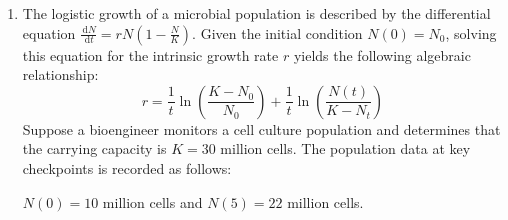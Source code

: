 \documentclass[11pt,svgnames,spanish,oneside]{amsart}
\newenvironment{mysolution}{%
  \bigskip

  \solution\color{blue}Sol:
}{%
  \endsolution
}
\newcommand{\dd}{\, \text{d}}
\begin{document}
\begin{enumerate}[label=\textbf{P\arabic*.},itemsep=1em,leftmargin=*]
\begin{enumerate}
\begin{enumerate}
      \begin{center}
      \emph{The expected value of $X$ is $\mu$.}
      \end{center}
    \end{enumerate}
    \begin{mysolution}
      \begin{enumerate}[label=(\alph*)]
        \item The value of $\displaystyle \int_{-\infty}^{\infty} f(x) \,\dd x = 1$. Heuristically, $f(x)$ is the probability density function (PDF) of a continuous random variable $X$. Since the total probability over the entire real line must equal $100\%$, the total area under the density curve is exactly $1$.

        \item Let us apply the substitution $z = \frac{x-\mu}{\sigma}$. This implies $x - \mu = \sigma z$ and $\dd x = \sigma \dd z$. The limits of integration remain $-\infty$ and $\infty$. Substituting these into the integral gives:
        $$ \int_{-\infty}^{\infty} (x-\mu) f(x)\,\dd x = \int_{-\infty}^{\infty} (\sigma z) \frac{1}{\sqrt{2\pi}\sigma} \exp \left( - \frac{z^2}{2} \right) \sigma \dd z $$
        Canceling out $\sigma$ inside the fraction and pulling out constants:
        $$ = \frac{\sigma}{\sqrt{2\pi}} \int_{-\infty}^\infty z\, \exp(-z^2/2)\,\dd z $$

        \item From property (3) and the definitions given:
        $$ \int_{-\infty}^\infty (x-\mu)\, f(x)\,\dd x = \text{Expected Value} - \mu \int_{-\infty}^\infty\, f(x)\,\dd x $$
        Using the result from (b) and property (2), the left-hand side simplifies to:
        $$ \frac{\sigma}{\sqrt{2\pi}} \cdot (0) = 0 $$
        Using the result from (a), the second term on the right-hand side simplifies because \mbox{$\int_{-\infty}^\infty f(x)\dd x = 1$.} Thus, the equation becomes:
        $$ 0 = \text{Expected Value} - \mu \cdot (1) \implies \text{Expected Value} = \mu $$
      \end{enumerate}
      \end{mysolution}

  \end{enumerate}

  \medskip
  \item The logistic growth of a microbial population is described by the differential equation $\frac{\dd N}{\dd t} = rN\left(1 - \frac{N}{K}\right)$. Given the initial condition $N(0) = N_0$, solving this equation for the intrinsic growth rate $r$ yields the following algebraic relationship:
  $$ r = \frac{1}{t} \ln \left( \frac{K - N_0}{N_0} \right) + \frac{1}{t} \ln \left( \frac{N(t)}{K - N_t} \right) $$
  Suppose a bioengineer monitors a cell culture population and determines that the carrying capacity is $K = 30$ million cells. The population data at key checkpoints is recorded as follows:
  \begin{center}
    $N(0) = 10$ million cells \quad and \quad $N(5) = 22$ million cells.
  \end{center}


\end{enumerate}
\end{document}
